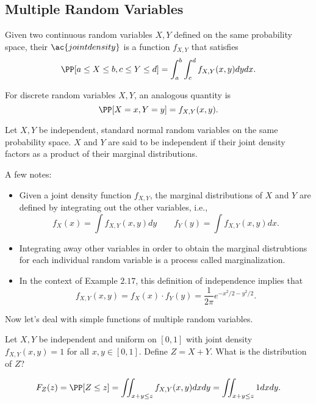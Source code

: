 \subsection{Multiple Random Variables}

\begin{definition}

Given two continuous random variables $X,Y$ defined on the same probability space, their $\ac{joint density}$ is a function $f_{X,Y}$ that satisfies 
\[\PP[a\leq X\leq b, c\leq Y\leq d] = \int_{a}^b\int_c^d f_{X,Y}(x,y) dydx.\]

For discrete random variables $X,Y$, an analogous quantity is 
\[\PP[X=x, Y=y] = f_{X,Y}(x,y).\]
\end{definition}

\begin{example}
\exlabel

Let $X,Y$ be independent, standard normal random variables on the same probability space. $X$ and $Y$ are said to be independent if their joint density factors as a product of their marginal distributions.
\end{example}

A few notes:
\begin{itemize}
    \item Given a joint density function $f_{X,Y}$, the \ac{marginal distributions} of $X$ and $Y$ are defined by integrating out the other variables, i.e.,
    \[f_X(x) = \int f_{X,Y}(x,y)dy\qquad f_Y(y) = \int f_{X,Y}(x,y) dx.\]
    \item Integrating away other variables in order to obtain the marginal distrubtions for each individual random variable is a process called \ac{marginalization}. 
    \item In the context of Example $2.17$, this definition of independence implies that 
    \[f_{X,Y}(x,y) = f_X(x)\cdot f_Y(y) = \frac{1}{2\pi}e^{-x^2/2-y^2/2}.\]
\end{itemize}

Now let's deal with simple functions of multiple random variables. 

\begin{example}
\exlabel

Let $X,Y$ be independent and uniform on $[0,1]$ with joint density $f_{X,Y}(x,y) = 1$ for all $x,y\in [0,1]$. Define $Z = X+Y$. What is the distribution of $Z$?
\end{example}

\[F_Z(z) = \PP[Z\leq z] = \iint_{x+y\leq z}f_{X,Y}(x,y)dxdy = \iint_{x+y\leq z}1dxdy.\]

